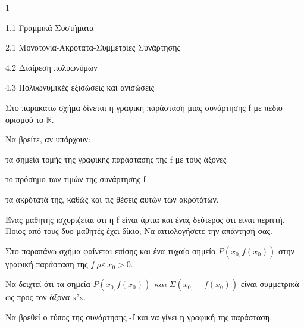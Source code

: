 \begin{ylh}{1}
\item 1.1 Γραμμικά Συστήματα
\item 2.1 Μονοτονία-Ακρότατα-Συμμετρίες Συνάρτησης
\item 4.2 Διαίρεση πολυωνύμων
\item 4.3 Πολυωνυμικές εξισώσεις και ανισώσεις
\end{ylh}
Στο παρακάτω σχήμα δίνεται η γραφική παράσταση μιας συνάρτησης f με πεδίο ορισμού το $\mathbb{R}$.
\begin{center}
\end{center}
\begin{alist}
\item Να βρείτε, αν υπάρχουν:
\begin{rlist}
\item τα σημεία τομής της γραφικής παράστασης της f με τους άξονες 
\item το πρόσημο των τιμών της συνάρτησης f 
\item τα ακρότατά της, καθώς και τις θέσεις αυτών των ακροτάτων. 
\end{rlist}
\item Ένας μαθητής ισχυρίζεται ότι η f είναι άρτια και ένας δεύτερος ότι είναι περιττή.
Ποιος από τους δυο μαθητές έχει δίκιο; Να αιτιολογήσετε την απάντησή σας.
\item Στο παραπάνω σχήμα φαίνεται επίσης και ένα τυχαίο σημείο $Ρ(x_{0,}f(x_{0}))$ στην γραφική παράσταση της $f\ \mu\varepsilon\ x_{0} > 0.$
\begin{rlist}
\item Να δειχτεί ότι τα σημεία $Ρ(x_{0,}f(x_{0}))\ \ \kappa\alpha\iota\ \Sigma(x_{0,} - f(x_{0}))$ είναι συμμετρικά ως προς τον άξονα x'x. 
\item Να βρεθεί ο τύπος της συνάρτησης -f και να γίνει η γραφική της παράσταση. 
\end{rlist}
\end{alist}

